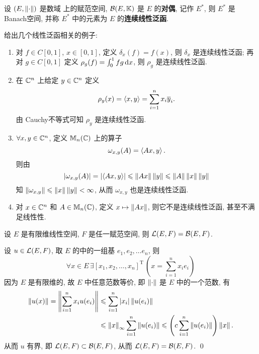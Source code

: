 \begin{Definition}[线性泛函]\label{def:线性泛函}
	设 $ (E, \left\| \cdot \right\|) $ 是数域 \K 上的赋范空间,  $ \mathcal{B}(E, \mathbb{K}) $ 是 $ E $ 的\textbf{对偶}, 记作 $ E^{*} $, 则 $ E^{*} $ 是Banach空间, 并称 $ E^{*} $ 中的元素为 $ E $ 的\textbf{连续线性泛函}.
\end{Definition}
\begin{Example}
	给出几个线性泛函相关的例子:
	\begin{enumerate}[(1)]
		\item  对 $ f\in C[0, 1] $, $ x\in [0, 1] $, 定义 $ \delta_{x}(f)=f(x) $, 则 $ \delta_{x} $ 是连续线性泛函; 再对 $ g\in C[0, 1] $ 定义 $ \rho_{g}(f)=\int_{0}^{1}fg\,\mathrm{d} x $, 则 $ \rho_{g} $ 是连续线性泛函.
		\item 在 $ \mathbb{C}^{n} $ 上给定 $ y\in\mathbb{C}^{n} $ 定义
		      \[
			      \rho_{y}(x)=\left\langle x, y \right\rangle=\sum_{i=1}^{n}x_{i}\overline{y}_{i}.
		      \]
		      由 Cauchy不等式可知 $ \rho_{y} $ 是连续线性泛函.
		\item $ \forall x, y\in \mathbb{C}^{n} $, 定义 $ \mathbb{M}_{n}(\mathbb{C}) $ 上的算子
		      \[
			      \omega_{x, y}(A)=\left\langle Ax, y \right\rangle.
		      \]
		      则由
		      \[
			      \left| \omega_{x, y}(A) \right| =\left| \left\langle Ax, y \right\rangle \right| \leqslant\left\| Ax \right\|\left\| y \right\|\leqslant\left\| A \right\|\left\| x \right\|\left\| y \right\|
		      \]
		      知 $ \left\| \omega_{x, y} \right\|\leqslant\left\| x \right\|\left\| y \right\|<\infty $, 从而 $ \omega_{x, y} $ 也是连续线性泛函.
		\item 对 $ x\in\mathbb{C}^{n} $ 和 $ A\in\mathbb{M}_{n}(\mathbb{C}) $, 定义 $ x\mapsto \left\| Ax \right\| $, 则它不是连续线性泛函, 甚至不满足线性性.
	\end{enumerate}
\end{Example}

\begin{Theorem}
	设 $ E $ 是有限维线性空间,  $ F $ 是任一赋范空间, 则 $ \mathcal{L}(E, F)=\mathcal{B}(E, F) $.
\end{Theorem}
\begin{Proof}
	设 $ u\in\mathcal{L}(E, F) $, 取 $ E $ 的中的一组基 $ e_{1}, e_{2}, \dots e_{n} $, 则
	\[
		\forall x\in E\,\exists[x_{1}, x_{2}, \dots, x_{n}]^{\mathrm T}\,\left(x=\sum_{i=1}^{n}x_{i}e_{i}\right)
	\]
	因为 $ E $ 是有限维的, 故 $ E $ 中任意范数等价, 即 $ \left\| \cdot \right\| $ 是 $ E $ 中的一个范数, 有
	\[
		\begin{aligned}
			\left\| u(x) \right\|=\left\| \sum_{i=1}^{n}x_{i}u(e_{i}) \right\| & \leqslant \sum_{i=1}^{n}\left| x_{i} \right| \left\| u(e_{i}) \right\|                                                                     \\
			                                               & \leqslant\left\| x \right\|_{\infty}\sum_{i=1}^{n}\left\| u(e_{i}) \right\|\leqslant\left( c\sum_{i=1}^{n}\left\| u(e_{i}) \right\| \right)\left\| x \right\|.
		\end{aligned}
	\]
	从而 $ u $ 有界, 即 $ \mathcal{L}(E, F)\subset\mathcal{B}(E, F) $, 从而 $ \mathcal{L}(E, F)=\mathcal{B}(E, F) $. \qed
\end{Proof}

